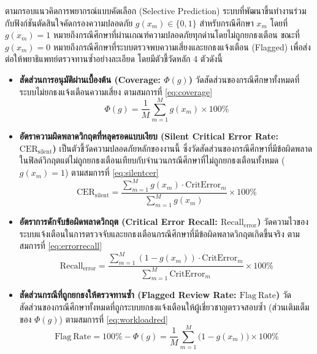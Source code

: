 ตามกรอบแนวคิดการพยากรณ์แบบคัดเลือก (Selective Prediction) \cite{geifman2017selective} ระบบที่พัฒนาขึ้นทำงานร่วมกับฟังก์ชันตัดสินใจคัดกรองความปลอดภัย $g(x_m) \in \{0, 1\}$ สำหรับกรณีศึกษา $x_m$ โดยที่ $g(x_m) = 1$ หมายถึงกรณีศึกษาที่ผ่านเกณฑ์ความปลอดภัยทุกด่านโดยไม่ถูกยกธงเตือน ขณะที่ $g(x_m) = 0$ หมายถึงกรณีศึกษาที่ระบบตรวจพบความเสี่ยงและยกธงแจ้งเตือน (Flagged) เพื่อส่งต่อให้พยาธิแพทย์ตรวจทานซ้ำอย่างละเอียด โดยมีตัวชี้วัดหลัก 4 ตัวดังนี้
\begin{itemize}
    \item \textbf{สัดส่วนการอนุมัติผ่านเบื้องต้น (Coverage: $\Phi(g)$)} วัดสัดส่วนของกรณีศึกษาทั้งหมดที่ระบบไม่ยกธงแจ้งเตือนความเสี่ยง ตามสมการที่ \eqref{eq:coverage}
\begin{equation}
\Phi(g) = \frac{1}{M} \sum_{m=1}^{M} g(x_m) \times 100\%
\label{eq:coverage}
\end{equation}
    \item \textbf{อัตราความผิดพลาดวิกฤตที่หลุดรอดแบบเงียบ (Silent Critical Error Rate: $\mathrm{CER}_{\mathrm{silent}}$)} เป็นตัวชี้วัดความปลอดภัยหลักของงานนี้ ซึ่งวัดสัดส่วนของกรณีศึกษาที่มีข้อผิดพลาดในฟิลด์วิกฤตแต่ไม่ถูกยกธงเตือนเทียบกับจำนวนกรณีศึกษาที่ไม่ถูกยกธงเตือนทั้งหมด ($g(x_m) = 1$) ตามสมการที่ \eqref{eq:silentcer}
\begin{equation}
\mathrm{CER}_{\mathrm{silent}} = \frac{\sum_{m=1}^{M} g(x_m) \cdot \mathrm{CritError}_m}{\sum_{m=1}^{M} g(x_m)} \times 100\%
\label{eq:silentcer}
\end{equation}
    \item \textbf{อัตราการดักจับข้อผิดพลาดวิกฤต (Critical Error Recall: $\mathrm{Recall}_{\mathrm{error}}$)} วัดความไวของระบบแจ้งเตือนในการตรวจจับและยกธงเตือนกรณีศึกษาที่มีข้อผิดพลาดวิกฤตเกิดขึ้นจริง ตามสมการที่ \eqref{eq:errorrecall}
\begin{equation}
\mathrm{Recall}_{\mathrm{error}} = \frac{\sum_{m=1}^{M} (1 - g(x_m)) \cdot \mathrm{CritError}_m}{\sum_{m=1}^{M} \mathrm{CritError}_m} \times 100\%
\label{eq:errorrecall}
\end{equation}
    \item \textbf{สัดส่วนกรณีที่ถูกยกธงให้ตรวจทานซ้ำ (Flagged Review Rate: $\mathrm{Flag\ Rate}$)} วัดสัดส่วนของกรณีศึกษาทั้งหมดที่ถูกระบบยกธงแจ้งเตือนให้ผู้เชี่ยวชาญตรวจสอบซ้ำ (ส่วนเติมเต็มของ $\Phi(g)$) ตามสมการที่ \eqref{eq:workloadred}
\begin{equation}
\mathrm{Flag\ Rate} = 100\% - \Phi(g) = \frac{1}{M} \sum_{m=1}^{M} \bigl(1 - g(x_m)\bigr) \times 100\%
\label{eq:workloadred}
\end{equation}
\end{itemize}

